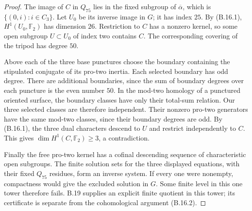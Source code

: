 \begin{proof}
The image of $C$ in $Q_{75}$ lies in the fixed subgroup of
$\overline\alpha$, which is $\{(0,i):i\in C_3\}$.
Let $U_0$ be its inverse image in $G$; it has index $25$.
By (B.16.1), $H^1(U_0,\mathbb F_2)$ has dimension $26$.
Restriction to $C$ has a nonzero kernel, so some open subgroup
$U\subset U_0$ of index two contains $C$.
The corresponding covering of the tripod has degree $50$.

Above each of the three base punctures choose the boundary
containing the stipulated conjugate of its pro-two inertia.
Each selected boundary has odd degree. There are additional
boundaries, since the sum of boundary degrees over each puncture
is the even number $50$. In the mod-two homology of a punctured
oriented surface, the boundary classes have only their total-sum
relation. Our three selected classes are therefore independent.
Their nonzero pro-two generators have the same mod-two classes,
since their boundary degrees are odd. By (B.16.1), the three dual
characters descend to $U$ and restrict independently to $C$.
This gives $\dim H^1(C,\mathbb F_2)\geq3$, a contradiction.

Finally the free pro-two kernel has a cofinal descending sequence
of characteristic open subgroups. The finite solution sets for the
three displayed equations, with their fixed $Q_{75}$ residues,
form an inverse system. If every one were nonempty, compactness
would give the excluded solution in $G$. Some finite level in this
one tower therefore fails. B.19 supplies an explicit finite quotient in this tower; its
certificate is separate from the cohomological argument (B.16.2).
\end{proof}

